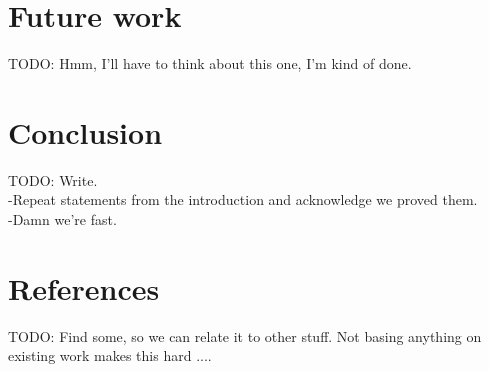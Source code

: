 \documentclass[a4paper,10pt]{article}
\begin{document}
\section{Future work}

TODO: Hmm, I'll have to think about this one, I'm kind of done.

\section{Conclusion}

TODO: Write.\\
-Repeat statements from the introduction and acknowledge we proved them.\\
-Damn we're fast.

\section{References}

TODO: Find some, so we can relate it to other stuff. Not basing anything on existing work makes this hard ....
\end{document}
